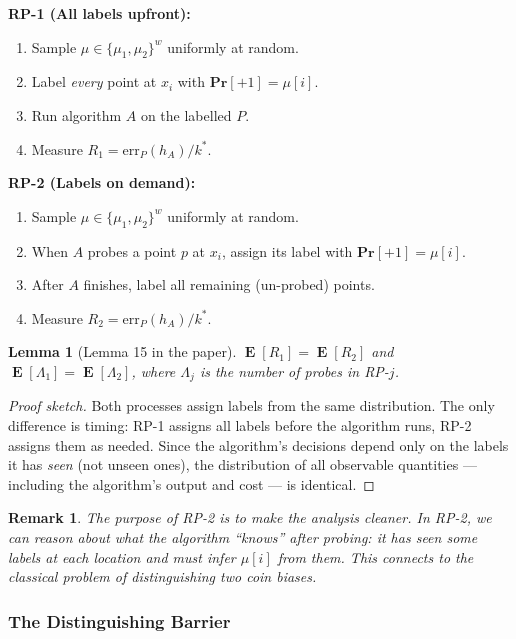 \documentclass[11pt, a4paper]{article}
\theoremstyle{boxed}
\newtheorem{innerlemma}{Lemma}[section]
\newtheorem{innerremark}{Remark}[section]
\newenvironment{lemma}
  {\begin{mdframed}[style=lemstyle]\begin{innerlemma}}
  {\end{innerlemma}\end{mdframed}}
\newenvironment{remark}
  {\begin{mdframed}[style=notestyle]\begin{innerremark}}
  {\end{innerremark}\end{mdframed}}
\DeclareMathOperator{\E}{\mathbf{E}}
\renewcommand{\Pr}{\mathbf{Pr}}
\newcommand{\kstar}{k^{*}}
\begin{document}
\medskip
\noindent\textbf{RP-1 (All labels upfront):}
\begin{enumerate}
  \item Sample $\mu \in \{\mu_1, \mu_2\}^w$ uniformly at random.
  \item Label \emph{every} point at $x_i$ with $\Pr[+1] = \mu[i]$.
  \item Run algorithm $A$ on the labelled $P$.
  \item Measure $R_1 = \mathrm{err}_P(h_A) / \kstar$.
\end{enumerate}
\newpage
\noindent\textbf{RP-2 (Labels on demand):}
\begin{enumerate}
  \item Sample $\mu \in \{\mu_1, \mu_2\}^w$ uniformly at random.
  \item When $A$ probes a point $p$ at $x_i$, assign its label with $\Pr[+1] = \mu[i]$.
  \item After $A$ finishes, label all remaining (un-probed) points.
  \item Measure $R_2 = \mathrm{err}_P(h_A) / \kstar$.
\end{enumerate}

\begin{lemma}[Lemma 15 in the paper]\label{lem:rp-equiv}
  $\E[R_1] = \E[R_2]$ and $\E[\Lambda_1] = \E[\Lambda_2]$, where $\Lambda_j$ is the number of probes in RP-$j$.
\end{lemma}

\begin{proof}[Proof sketch]
  Both processes assign labels from the same distribution. The only difference is timing: RP-1 assigns all labels before the algorithm runs, RP-2 assigns them as needed. Since the algorithm's decisions depend only on the labels it has \emph{seen} (not unseen ones), the distribution of all observable quantities --- including the algorithm's output and cost --- is identical.
\end{proof}

\begin{remark}
  The purpose of RP-2 is to make the analysis cleaner. In RP-2, we can reason about what the algorithm ``knows'' after probing: it has seen some labels at each location and must infer $\mu[i]$ from them. This connects to the classical problem of distinguishing two coin biases.
\end{remark}

\subsubsection{The Distinguishing Barrier}
\end{document}
